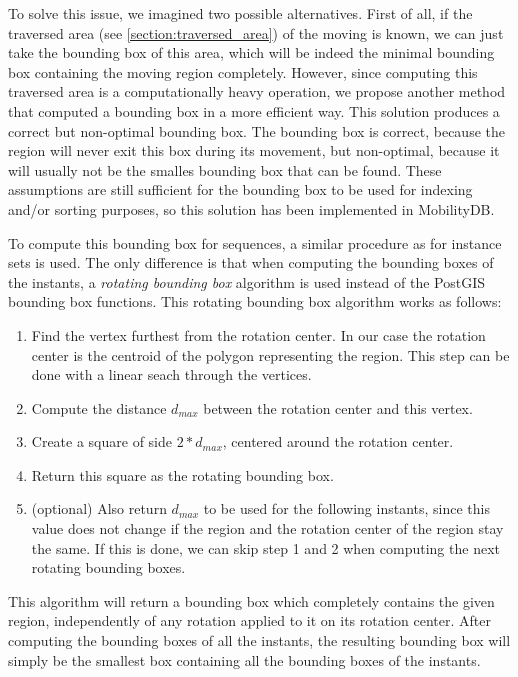 	To solve this issue, we imagined two possible alternatives. First of all, if the traversed area (see \ref{section:traversed_area}) of the moving is known, we can just take the bounding box of this area, which will be indeed the minimal bounding box containing the moving region completely. However, since computing this traversed area is a computationally heavy operation, we propose another method that computed a bounding box in a more efficient way. This solution produces a correct but non-optimal bounding box. The bounding box is correct, because the region will never exit this box during its movement, but non-optimal, because it will usually not be the smalles bounding box that can be found. These assumptions are still sufficient for the bounding box to be used for indexing and/or sorting purposes, so this solution has been implemented in MobilityDB.
	
	To compute this bounding box for sequences, a similar procedure as for instance sets is used. The only difference is that when computing the bounding boxes of the instants, a \textit{rotating bounding box} algorithm is used instead of the PostGIS bounding box functions. This rotating bounding box algorithm works as follows:
	
	\begin{enumerate}
		\item Find the vertex furthest from the rotation center. In our case the rotation center is the centroid of the polygon representing the region. This step can be done with a linear seach through the vertices.
		\item Compute the distance $d_{max}$ between the rotation center and this vertex.
		\item Create a square of side $2*d_{max}$, centered around the rotation center.
		\item Return this square as the rotating bounding box.
		\item (optional) Also return $d_{max}$ to be used for the following instants, since this value does not change if the region and the rotation center of the region stay the same. If this is done, we can skip step 1 and 2 when computing the next rotating bounding boxes.
	\end{enumerate}
	
	
	This algorithm will return a bounding box which completely contains the given region, independently of any rotation applied to it on its rotation center. After computing the bounding boxes of all the instants, the resulting bounding box will simply be the smallest box containing all the bounding boxes of the instants.
	
